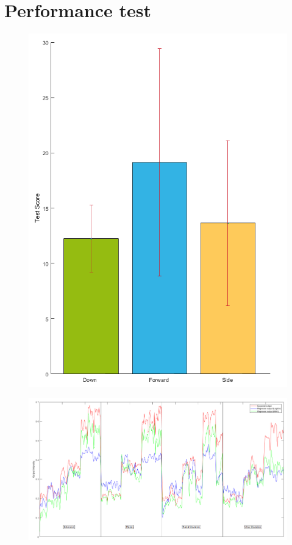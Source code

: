 \section{Performance test}


\begin{figure}[H]
	\includegraphics[width=1\textwidth]{figures/results/TestScore.png}  %
	\caption{}
	\label{fig:TestScore}
\end{figure}


\begin{figure}[H]
	\includegraphics[width=1\textwidth]{figures/results/regressionOutputVsInput.png}  %
	\caption{}
	\label{fig:regressionOutputVsInput}
\end{figure}